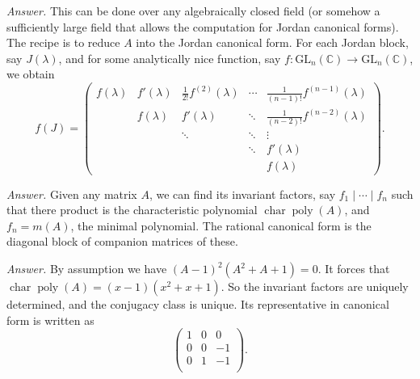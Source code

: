 \documentclass{mathproblems}
\newcommand\C{\mathbb{C}}
\newcommand\GL{\mathrm{GL}}
\begin{document}
\begin{questions}

\textit{Answer.} This can be done over any algebraically closed field (or somehow a sufficiently large field that allows the computation for Jordan canonical forms). The recipe is to reduce $A$ into the Jordan canonical form. For each Jordan block, say $J(\lambda)$, and for some analytically nice function, say $f:\GL_n(\C)\to \GL_n(\C)$, we obtain
$$
f(J)=\begin{pmatrix}
f(\lambda) & f'(\lambda) & \frac{1}{2!}f^{(2)}(\lambda) & \cdots & \frac{1}{(n-1)!}f^{(n-1)}(\lambda)\\
& f(\lambda) & f'(\lambda) & \ddots & \frac{1}{(n-2)!}f^{(n-2)}(\lambda)\\
& & \ddots & \ddots & \vdots \\
& & & \ddots & f'(\lambda) \\
& & & & f(\lambda)
\end{pmatrix}.
$$


\textit{Answer.} Given any matrix $A$, we can find its invariant factors, say $f_1\mid \cdots \mid f_n$ such that there product is the characteristic polynomial $\operatorname{char}\operatorname{poly}(A)$, and $f_n=m(A)$, the minimal polynomial. The rational canonical form is the diagonal block of companion matrices of these.


\textit{Answer.} By assumption we have $(A - 1)^2 (A^2 + A + 1)=0$. It forces that $\operatorname{char}\operatorname{poly}(A)=(x-1)(x^2 + x + 1)$. So the invariant factors are uniquely determined, and the conjugacy class is unique. Its representative in canonical form is written as
$$
\begin{pmatrix}
    1 & 0 & 0\\
    0 & 0 & -1\\
    0 & 1 & -1\\
\end{pmatrix}.
$$



\end{questions}
\end{document}
